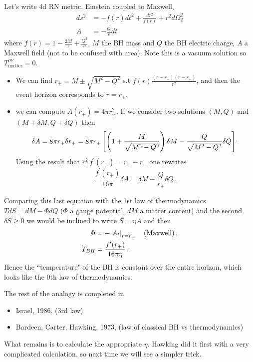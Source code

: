 \documentclass{article}
\begin{document}
\begin{example}
	Let's write 4d RN metric, Einstein coupled to Maxwell, 
	\begin{align*}
	 ds^2 &= -f(r)dt^2 + \frac{dr^2}{f(r)} + r^2 d\Omega_2^2 \\
	 A &= -\frac{Q}{r}dt 
	\end{align*}
where $f(r) = 1-\frac{2M}{r}+\frac{Q^2}{r^2}$, $M$ the BH mass and $Q$ the BH electric charge, $A$ a Maxwell field (not to be confused with area). Note this is a vacuum solution so $T^{\mu\nu}_{\text{matter}}=0$.
\begin{itemize}
	\item We can find $r_{\pm} = M \pm \sqrt{M^2-Q^2}$ s.t $f(r) \frac{(r-r_-)(r-r_+)}{r^2}$, and then the event horizon corresponds to $r=r_+$. 
	\item we can compute $A(r_+) = 4\pi r_+^2$. If we consider two solutions $(M, Q)$ and $(M+\delta M, Q+\delta Q)$ then 
	\[
	\delta A = 8 \pi r_+ \delta r_+ = 8 \pi r_+ \left[ \left( 1+\frac{M}{\sqrt{M^2-Q^2}} \right) \delta M - \frac{Q}{\sqrt{M^2-Q^2}}\delta Q \right] \, .
	\]
	Using the result that $r_+^2 f^\prime (r_+) = r_+ - r_-$ one rewrites 
	\[
	\frac{f^\prime(r_+)}{16 \pi} \delta A = \delta M - \frac{Q}{r_+} \delta Q \, .
	\]
\end{itemize} 
Comparing this last equation with the 1st law of thermodynamics $TdS = dM -\Phi dQ$ ($\Phi$ a gauge potential, $dM$ a matter content) and the second $\delta S \geq 0$ we would be inclined to write $S = \eta A$ and then 
\begin{align*}
	\Phi &= -\left. A_t \right\rvert_{r=r_+} \quad (\text{Maxwell}) \, , \\ 
	T_{BH} &= \frac{f^\prime(r_+)}{16 \pi \eta} \, .
\end{align*}
Hence the ``temperature" of the BH is constant over the entire horizon, which looks like the 0th law of thermodynamics. 
\end{example}
The rest of the analogy is completed in 
\begin{itemize}
	\item Israel, 1986, (3rd law)
	\item Bardeen, Carter, Hawking, 1973, (law of classical BH vs thermodynamics)
\end{itemize}
What remains is to calculate the appropriate $\eta$. Hawking did it first with a very complicated calculation, so next time we will see a simpler trick. 
\end{document}
